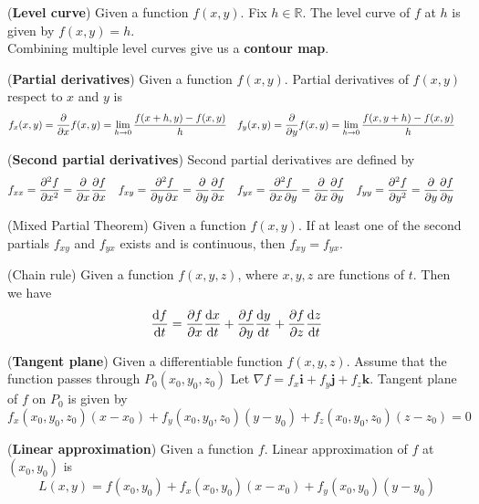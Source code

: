 \documentclass{huhtakm-template-book}
\begin{document}
\begin{defn}(\textbf{Level curve})
    Given a function $f(x,y)$.
    Fix $h\in\mathbb{R}$. The level curve of $f$ at $h$ is given by $f(x,y)=h$.\\
    Combining multiple level curves give us a \textbf{contour map}.
\end{defn}
\begin{defn}(\textbf{Partial derivatives})
    Given a function $f(x,y)$. Partial derivatives of $f(x,y)$ respect to $x$ and $y$ is
    \begin{align*}
        f_{x}(x,y)=\pdv*{f(x,y)}{x}&=\lim_{h\to 0}\frac{f(x+h,y)-f(x,y)}{h} & f_{y}(x,y)=\pdv*{f(x,y)}{y}&=\lim_{h\to 0}\frac{f(x,y+h)-f(x,y)}{h}
    \end{align*}
\end{defn}
\begin{defn}(\textbf{Second partial derivatives})
    Second partial derivatives are defined by
    \begin{align*}
        f_{xx}&=\pdv[order={2}]{f}{x}=\pdv*{\pdv{f}{x}}{x} & f_{xy}&=\pdv{f}{y,x}=\pdv*{\pdv{f}{x}}{y} & f_{yx}&=\pdv{f}{x,y}=\pdv*{\pdv{f}{y}}{x} & f_{yy}&=\pdv[order={2}]{f}{y}=\pdv*{\pdv{f}{y}}{y}
    \end{align*}
\end{defn}
\begin{thm}(Mixed Partial Theorem)
    Given a function $f(x,y)$. If at least one of the second partials $f_{xy}$ and $f_{yx}$ exists and is continuous, then $f_{xy}=f_{yx}$.
\end{thm}
\begin{lem}(Chain rule)
    Given a function $f(x,y,z)$, where $x,y,z$ are functions of $t$. Then we have
    \begin{equation*}
        \odv{f}{t}=\pdv{f}{x}\odv{x}{t}+\pdv{f}{y}\odv{y}{t}+\pdv{f}{z}\odv{z}{t}
    \end{equation*}
\end{lem}
\begin{defn}(\textbf{Tangent plane})
    Given a differentiable function $f(x,y,z)$. Assume that the function passes through $P_{0}(x_{0},y_{0},z_{0})$ Let $\nabla f=f_{x}\mathbf{i}+f_{y}\mathbf{j}+f_{z}\mathbf{k}$. Tangent plane of $f$ on $P_{0}$ is given by
    \begin{equation*}
        f_{x}(x_{0},y_{0},z_{0})(x-x_{0})+f_{y}(x_{0},y_{0},z_{0})(y-y_{0})+f_{z}(x_{0},y_{0},z_{0})(z-z_{0})=0
    \end{equation*}
\end{defn}
\begin{defn}(\textbf{Linear approximation})
    Given a function $f$. Linear approximation of $f$ at $(x_{0},y_{0})$ is
    \begin{equation*}
        L(x,y)=f(x_{0},y_{0})+f_{x}(x_{0},y_{0})(x-x_{0})+f_{y}(x_{0},y_{0})(y-y_{0})
    \end{equation*}
\end{defn}
\end{document}
